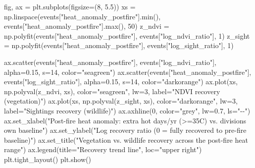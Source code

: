 \documentclass[
  letterpaper,
  DIV=11,
  numbers=noendperiod]{scrartcl}
\newenvironment{Shaded}{\begin{snugshade}}{\end{snugshade}}
\newcommand{\BuiltInTok}[1]{\textcolor[rgb]{0.00,0.23,0.31}{#1}}
\newcommand{\DecValTok}[1]{\textcolor[rgb]{0.68,0.00,0.00}{#1}}
\newcommand{\FloatTok}[1]{\textcolor[rgb]{0.68,0.00,0.00}{#1}}
\newcommand{\NormalTok}[1]{\textcolor[rgb]{0.00,0.23,0.31}{#1}}
\newcommand{\OperatorTok}[1]{\textcolor[rgb]{0.37,0.37,0.37}{#1}}
\newcommand{\StringTok}[1]{\textcolor[rgb]{0.13,0.47,0.30}{#1}}
\begin{document}
\begin{Shaded}
\begin{Highlighting}[]
\NormalTok{fig, ax }\OperatorTok{=}\NormalTok{ plt.subplots(figsize}\OperatorTok{=}\NormalTok{(}\DecValTok{8}\NormalTok{, }\FloatTok{5.5}\NormalTok{))}
\NormalTok{xs }\OperatorTok{=}\NormalTok{ np.linspace(events[}\StringTok{"heat\_anomaly\_postfire"}\NormalTok{].}\BuiltInTok{min}\NormalTok{(), events[}\StringTok{"heat\_anomaly\_postfire"}\NormalTok{].}\BuiltInTok{max}\NormalTok{(), }\DecValTok{50}\NormalTok{)}
\NormalTok{z\_ndvi }\OperatorTok{=}\NormalTok{ np.polyfit(events[}\StringTok{"heat\_anomaly\_postfire"}\NormalTok{], events[}\StringTok{"log\_ndvi\_ratio"}\NormalTok{], }\DecValTok{1}\NormalTok{)}
\NormalTok{z\_sight }\OperatorTok{=}\NormalTok{ np.polyfit(events[}\StringTok{"heat\_anomaly\_postfire"}\NormalTok{], events[}\StringTok{"log\_sight\_ratio"}\NormalTok{], }\DecValTok{1}\NormalTok{)}

\NormalTok{ax.scatter(events[}\StringTok{"heat\_anomaly\_postfire"}\NormalTok{], events[}\StringTok{"log\_ndvi\_ratio"}\NormalTok{], alpha}\OperatorTok{=}\FloatTok{0.15}\NormalTok{, s}\OperatorTok{=}\DecValTok{14}\NormalTok{, color}\OperatorTok{=}\StringTok{"seagreen"}\NormalTok{)}
\NormalTok{ax.scatter(events[}\StringTok{"heat\_anomaly\_postfire"}\NormalTok{], events[}\StringTok{"log\_sight\_ratio"}\NormalTok{], alpha}\OperatorTok{=}\FloatTok{0.15}\NormalTok{, s}\OperatorTok{=}\DecValTok{14}\NormalTok{, color}\OperatorTok{=}\StringTok{"darkorange"}\NormalTok{)}
\NormalTok{ax.plot(xs, np.polyval(z\_ndvi, xs), color}\OperatorTok{=}\StringTok{"seagreen"}\NormalTok{, lw}\OperatorTok{=}\DecValTok{3}\NormalTok{, label}\OperatorTok{=}\StringTok{"NDVI recovery (vegetation)"}\NormalTok{)}
\NormalTok{ax.plot(xs, np.polyval(z\_sight, xs), color}\OperatorTok{=}\StringTok{"darkorange"}\NormalTok{, lw}\OperatorTok{=}\DecValTok{3}\NormalTok{, label}\OperatorTok{=}\StringTok{"Sightings recovery (wildlife)"}\NormalTok{)}
\NormalTok{ax.axhline(}\DecValTok{0}\NormalTok{, color}\OperatorTok{=}\StringTok{"grey"}\NormalTok{, lw}\OperatorTok{=}\FloatTok{0.7}\NormalTok{, ls}\OperatorTok{=}\StringTok{"{-}{-}"}\NormalTok{)}
\NormalTok{ax.set\_xlabel(}\StringTok{"Post{-}fire heat anomaly: extra hot days/yr (\textgreater{}=35C) vs. division\textquotesingle{}s own baseline"}\NormalTok{)}
\NormalTok{ax.set\_ylabel(}\StringTok{"Log recovery ratio (0 = fully recovered to pre{-}fire baseline)"}\NormalTok{)}
\NormalTok{ax.set\_title(}\StringTok{"Vegetation vs. wildlife recovery across the post{-}fire heat range"}\NormalTok{)}
\NormalTok{ax.legend(title}\OperatorTok{=}\StringTok{"Recovery trend line"}\NormalTok{, loc}\OperatorTok{=}\StringTok{"upper right"}\NormalTok{)}
\NormalTok{plt.tight\_layout()}
\NormalTok{plt.show()}
\end{Highlighting}
\end{Shaded}
\end{document}
